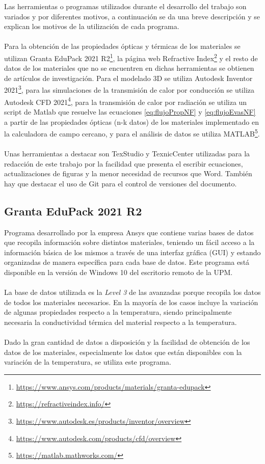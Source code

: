 Las herramientas o programas utilizados durante el desarrollo del trabajo son variados y por diferentes motivos, a continuación se da una breve descripción y se explican los motivos de la utilización de cada programa.\\\\
Para la obtención de las propiedades ópticas y térmicas de los materiales se utilizan Granta EduPack 2021 R2\footnote{\href{https://www.ansys.com/products/materials/granta-edupack}{https://www.ansys.com/products/materials/granta-edupack}}, la página web Refractive Index\footnote{\href{https://refractiveindex.info/}{https://refractiveindex.info/}} y el resto de datos de los materiales que no se encuentren en dichas herramientas se obtienen de artículos de investigación. Para el modelado 3D se utiliza Autodesk Inventor 2021\footnote{\href{https://www.autodesk.es/products/inventor/overview}{https://www.autodesk.es/products/inventor/overview}}, para las simulaciones de la transmisión de calor por conducción se utiliza Autodesk CFD 2021\footnote{\href{https://www.autodesk.com/products/cfd/overview}{https://www.autodesk.com/products/cfd/overview}}, para la transmisión de calor por radiación se utiliza un script de Matlab que resuelve las ecuaciones \eqref{eq:flujoPropNF} y \eqref{eq:flujoEvasNF} a partir de las propiedades ópticas (n-k datos) de los materiales implementado en la calculadora de campo cercano, y para el análisis de datos se utiliza MATLAB\footnote{\href{https://matlab.mathworks.com/}{https://matlab.mathworks.com/}}.\\\\
Unas herramientas a destacar son TexStudio y TexnicCenter utilizadas para la redacción de este trabajo por la facilidad que presenta el escribir ecuaciones, actualizaciones de figuras y la menor necesidad de recursos que Word. También hay que destacar el uso de Git para el control de versiones del documento.\\
\subsection{Granta EduPack 2021 R2}\label{sec:grantaEduPack}
Programa desarrollado por la empresa Ansys que contiene varias bases de datos que recopila información sobre distintos materiales, teniendo un fácil acceso a la información básica de los mismos a través de una interfaz gráfica (GUI) y estando organizadas de manera específica para cada base de datos. Este programa está disponible en la versión de Windows 10 del escritorio remoto de la UPM.\\\\
La base de datos utilizada es la \textit{Level 3} de las avanzadas porque recopila los datos de todos los materiales necesarios. En la mayoría de los casos incluye la variación de algunas propiedades respecto a la temperatura, siendo principalmente necesaria la conductividad térmica del material respecto a la temperatura.\\\\
Dado la gran cantidad de datos a disposición y la facilidad de obtención de los datos de los materiales, especialmente los datos que están disponibles con la variación de la temperatura, se utiliza este programa.
